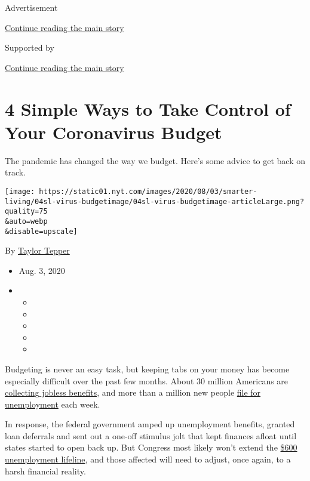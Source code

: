 Advertisement

\protect\hyperlink{after-top}{Continue reading the main story}

Supported by

\protect\hyperlink{after-sponsor}{Continue reading the main story}

\hypertarget{4-simple-ways-to-take-control-of-your-coronavirus-budget}{%
\section{4 Simple Ways to Take Control of Your Coronavirus
Budget}\label{4-simple-ways-to-take-control-of-your-coronavirus-budget}}

The pandemic has changed the way we budget. Here's some advice to get
back on track.

\texttt{[image: https://static01.nyt.com/images/2020/08/03/smarter-living/04sl-virus-budgetimage/04sl-virus-budgetimage-articleLarge.png?quality=75\\\&auto=webp\\\&disable=upscale]}

By \href{https://www.nytimes.com/by/taylor-tepper}{Taylor Tepper}

\begin{itemize}
\item
  Aug. 3, 2020
\item
  \begin{itemize}
  \item
  \item
  \item
  \item
  \item
  \end{itemize}
\end{itemize}

Budgeting is never an easy task, but keeping tabs on your money has
become especially difficult over the past few months. About 30 million
Americans are
\href{https://www.nytimes.com/live/2020/07/23/business/stock-market-today-coronavirus\#coin-shortage-united-states-mint}{collecting
jobless benefits}, and more than a million new people
\href{https://www.dol.gov/ui/data.pdf}{file for unemployment} each week.

In response, the federal government amped up unemployment benefits,
granted loan deferrals and sent out a one-off stimulus jolt that kept
finances afloat until states started to open back up. But Congress most
likely won't extend the
\href{https://www.nytimes.com/interactive/2020/07/24/business/economy/600-unemployment-benefits.html}{\$600
unemployment lifeline}, and those affected will need to adjust, once
again, to a harsh financial reality.

